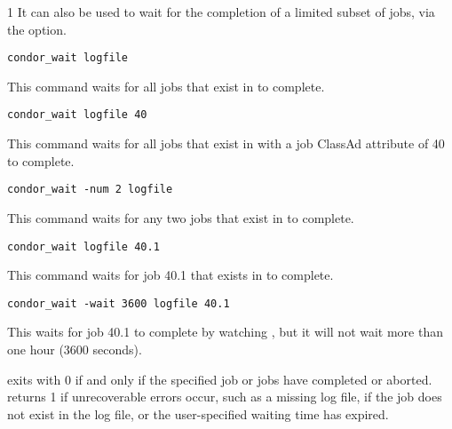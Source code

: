 \begin{ManPage}{\label{man-condor-wait}}{1}
It can also be used to wait for the completion of a limited subset of
jobs, via the  option.

\Examples

\begin{verbatim}
condor_wait logfile
\end{verbatim}
This command waits for all jobs that exist in  to complete.

\begin{verbatim}
condor_wait logfile 40
\end{verbatim}
This command waits for all jobs that exist in  
with a job ClassAd attribute  of
40 to complete.

\begin{verbatim}
condor_wait -num 2 logfile
\end{verbatim}
This command waits for any two jobs that exist in  to
complete.

\begin{verbatim}
condor_wait logfile 40.1
\end{verbatim}
This command waits for job 40.1 that exists in  to
complete.

\begin{verbatim}
condor_wait -wait 3600 logfile 40.1
\end{verbatim}
This waits for job 40.1 to
complete by watching , but it will not wait more than one
hour (3600 seconds).

\ExitStatus

 exits with 0 if and only if the specified job or jobs
have completed or
aborted.  returns 1 if unrecoverable errors occur, such
as a missing log file, if the job does not exist in the log file, or
the user-specified waiting time has expired.

\end{ManPage}
